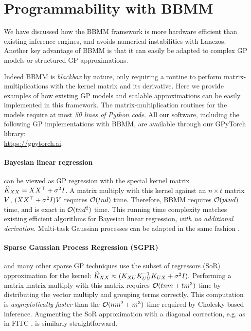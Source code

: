 \section{Programmability with BBMM}
\label{sec:advantages}
We have discussed how the BBMM framework is more hardware efficient than existing inference engines, and avoids numerical instabilities with Lanczos. Another key advantage of BBMM is that it can easily be adapted to complex GP models or structured GP approximations.

Indeed BBMM is \emph{blackbox} by nature, only requiring a routine to perform matrix-multiplications with the kernel matrix and its derivative.
Here we provide examples of how existing GP models and scalable approximations can be easily implemented in this framework.
The matrix-multiplication routines for the models require at most \emph{50 lines of Python code}.
All our software, including the following GP implementations with BBMM, are available through our GPyTorch library: \\
\url{https://gpytorch.ai}.
%

\paragraph{Bayesian linear regression} can be viewed as GP regression with the special kernel matrix $\widehat{K}_{XX} = XX^{\top} + \sigma^{2}I$.
A matrix multiply with this kernel against an $n \times t$ matrix $V$, $(XX^{\top} + \sigma^{2}I)V$ requires $\bigo{tnd}$ time.
Therefore, BBMM requires $\bigo{ptnd}$ time, and is exact in $\bigo{tnd^2}$ time.
This running time complexity matches existing efficient algorithms for Bayesian linear regression, \emph{with no additional derivation}.
Multi-task Gaussian processes \cite{bonilla2008multi} can be adapted in the same fashion \cite{gardner2018product}.

\paragraph{Sparse Gaussian Process Regression (SGPR)} \cite{titsias2009variational} and many other sparse GP techniques \cite{quinonero2005unifying,snelson2006sparse,hensman2013gaussian} use the subset of regressors (SoR) approximation for the kernel:
$
  \widehat{K}_{XX} \approx (K_{XU}K_{UU}^{-1}K_{UX} + \sigma^{2}I).
$
Performing a matrix-matrix multiply with this matrix requires $\bigo{tnm + tm^{3}}$ time by distributing the vector multiply and grouping terms correctly.
This computation is \emph{asymptotically faster} than the $\bigo{nm^{2} + m^{3}}$ time required by Cholesky based inference. Augmenting the SoR approximation with a diagonal correction, e.g. as in FITC \cite{snelson2006sparse}, is similarly straightforward.

